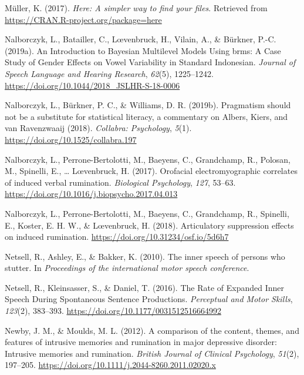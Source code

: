 \documentclass[a4paper,12pt,twoside,onecolumn,openright,final,oldfontcommands]{memoir}
\begin{document}
\leavevmode\hypertarget{ref-R-here}{}%
Müller, K. (2017). \emph{Here: A simpler way to find your files}. Retrieved from \url{https://CRAN.R-project.org/package=here}

\leavevmode\hypertarget{ref-nalborczyk_introduction_2019}{}%
Nalborczyk, L., Batailler, C., Lœvenbruck, H., Vilain, A., \& Bürkner, P.-C. (2019a). An Introduction to Bayesian Multilevel Models Using brms: A Case Study of Gender Effects on Vowel Variability in Standard Indonesian. \emph{Journal of Speech Language and Hearing Research}, \emph{62}(5), 1225--1242. \url{https://doi.org/10.1044/2018_JSLHR-S-18-0006}

\leavevmode\hypertarget{ref-nalborczyk_pragmatism_2019}{}%
Nalborczyk, L., Bürkner, P. C., \& Williams, D. R. (2019b). Pragmatism should not be a substitute for statistical literacy, a commentary on Albers, Kiers, and van Ravenzwaaij (2018). \emph{Collabra: Psychology}, \emph{5}(1). \url{https://doi.org/10.1525/collabra.197}

\leavevmode\hypertarget{ref-nalborczyk_orofacial_2017}{}%
Nalborczyk, L., Perrone-Bertolotti, M., Baeyens, C., Grandchamp, R., Polosan, M., Spinelli, E., \ldots{} Lœvenbruck, H. (2017). Orofacial electromyographic correlates of induced verbal rumination. \emph{Biological Psychology}, \emph{127}, 53--63. \url{https://doi.org/10.1016/j.biopsycho.2017.04.013}

\leavevmode\hypertarget{ref-nalborczyk_articulatory_2018}{}%
Nalborczyk, L., Perrone-Bertolotti, M., Baeyens, C., Grandchamp, R., Spinelli, E., Koster, E. H. W., \& Lœvenbruck, H. (2018). Articulatory suppression effects on induced rumination. \url{https://doi.org/10.31234/osf.io/5d6h7}

\leavevmode\hypertarget{ref-netsell_inner_2010}{}%
Netsell, R., Ashley, E., \& Bakker, K. (2010). The inner speech of persons who stutter. In \emph{Proceedings of the international motor speech conference}.

\leavevmode\hypertarget{ref-netsell_rate_2016}{}%
Netsell, R., Kleinsasser, S., \& Daniel, T. (2016). The Rate of Expanded Inner Speech During Spontaneous Sentence Productions. \emph{Perceptual and Motor Skills}, \emph{123}(2), 383--393. \url{https://doi.org/10.1177/0031512516664992}

\leavevmode\hypertarget{ref-newby_comparison_2012}{}%
Newby, J. M., \& Moulds, M. L. (2012). A comparison of the content, themes, and features of intrusive memories and rumination in major depressive disorder: Intrusive memories and rumination. \emph{British Journal of Clinical Psychology}, \emph{51}(2), 197--205. \url{https://doi.org/10.1111/j.2044-8260.2011.02020.x}
\end{document}

